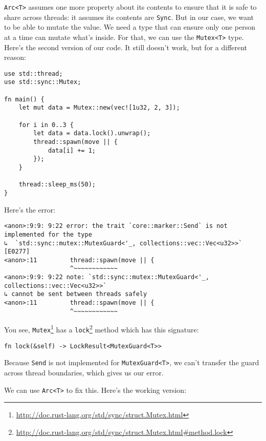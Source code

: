 \documentclass[a4paper,]{book}
\renewcommand{\href}[2]{#2\footnote{\url{#1}}}
\begin{document}
\texttt{Arc\textless{}T\textgreater{}} assumes one more property about
its contents to ensure that it is safe to share across threads: it
assumes its contents are \texttt{Sync}. But in our case, we want to be
able to mutate the value. We need a type that can ensure only one person
at a time can mutate what's inside. For that, we can use the
\texttt{Mutex\textless{}T\textgreater{}} type. Here's the second version
of our code. It still doesn't work, but for a different reason:

\begin{verbatim}
use std::thread;
use std::sync::Mutex;

fn main() {
    let mut data = Mutex::new(vec![1u32, 2, 3]);

    for i in 0..3 {
        let data = data.lock().unwrap();
        thread::spawn(move || {
            data[i] += 1;
        });
    }

    thread::sleep_ms(50);
}
\end{verbatim}

Here's the error:

\begin{verbatim}
<anon>:9:9: 9:22 error: the trait `core::marker::Send` is not implemented for the type
↳  `std::sync::mutex::MutexGuard<'_, collections::vec::Vec<u32>>` [E0277]
<anon>:11         thread::spawn(move || {
                  ^~~~~~~~~~~~~
<anon>:9:9: 9:22 note: `std::sync::mutex::MutexGuard<'_, collections::vec::Vec<u32>>` 
↳ cannot be sent between threads safely
<anon>:11         thread::spawn(move || {
                  ^~~~~~~~~~~~~
\end{verbatim}

You see,
\href{http://doc.rust-lang.org/std/sync/struct.Mutex.html}{\texttt{Mutex}}
has a
\href{http://doc.rust-lang.org/std/sync/struct.Mutex.html\#method.lock}{\texttt{lock}}
method which has this signature:

\begin{verbatim}
fn lock(&self) -> LockResult<MutexGuard<T>>
\end{verbatim}

Because \texttt{Send} is not implemented for
\texttt{MutexGuard\textless{}T\textgreater{}}, we can't transfer the
guard across thread boundaries, which gives us our error.

We can use \texttt{Arc\textless{}T\textgreater{}} to fix this. Here's
the working version:
\end{document}

